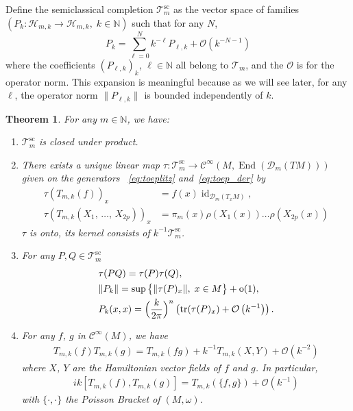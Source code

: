 \documentclass[10pt,a4paper]{article}
\newtheorem{theo}{Theorem}[section]
\theoremstyle{definition}
\numberwithin{equation}{section}
\newcommand{\N}{{\mathbb{N}}}
\newcommand{\om}{{\omega}}
\newcommand{\op}{\operatorname}
\newcommand{\Ci}{{\mathcal{C}}^{\infty}}
\newcommand{\bigo}{\mathcal{O}}
\newcommand{\D}{\mathcal{D}}
\newcommand{\Hilb}{\mathcal{H}}
\newcommand{\clT}{\mathcal{T}}
\begin{document}
 Define the semiclassical completion $\clT_m ^{\op{sc}}$ as the vector space of families $(P_k : \Hilb_{m,k} \rightarrow \Hilb_{m,k}, \; k \in
\N)$ such that for any $N$,
\[
P_k = \sum_{\ell= 0 } ^N k^{-\ell} P_{\ell,k} + \bigo \left(k ^{-N-1}\right)
\]
where the coefficients $(P_{\ell, k })_k$, $\ell \in \N$ all belong to $\clT_m$, and the $\bigo $ is for the operator norm. This expansion is meaningful because as we will see later, for any $\ell$, the operator norm $\| P_{\ell, k}\|$ is bounded independently of $k$.



\begin{theo}\label{theo:Toeplitz_Landau}
For any $m \in \N$, we have:
\begin{enumerate}
\item\label{theo1.3.1} $ \clT_m^{\op{sc}}$ is closed under product.
\item\label{theo1.3.2}  There exists a unique linear map $ \mathcal{\tau} : \clT_m^{\op{sc}} \rightarrow \Ci (M,
\op{End} (\D_m (TM))) $ given on the generators ~\eqref{eq:toeplitz} and~\eqref{eq:toep_der} by
\begin{equation}\label{eq:symbolmap}
\begin{split}
\tau (T_{m,k} (f))_x & = f(x) \op{id}_{\D_m (T_x M)}, \\ \tau \left(T_{m,k} \left(X_1,\, \ldots,\, X_{2p}\right)\right)_x & = \pi_m(x) \rho(X_1(x))
\ldots \rho (X_{2p}(x))
\end{split}
\end{equation}
$\tau$ is onto, its kernel consists of $k^{-1} \clT_{m}^{\op{sc}}$.
\item\label{theo1.3.3} For any $P,Q \in \clT_{m}^{\op{sc}}$
\begin{align}
 &\tau (PQ) = \tau (P) \tau (Q),\label{eq:prod} \\
 &\| P_k \| = \sup \big\{ \| \tau (P)_x \|, \; x \in M \big\} + \op{o} (1),  \label{eq:norm}\\ 
 &P_k(x,x) = \Bigl(\frac{k}{2\pi} \Bigr)^n \left(\op{tr} (\tau (P)_x) + \bigo \left(k^{-1}\right)\right).\label{eq:trace}
\end{align}
\item\label{theo1.3.4} For any $f$, $g$ in $\Ci (M)$, we have
\begin{gather}\label{eq:produit}
T_{m,k} (f) T_{m,k} (g) = T_{m,k} (fg) + k^{-1} T_{m,k} (X,Y) + \bigo \left(k^{-2}\right)
\end{gather}
where $X$, $Y$ are the Hamiltonian vector fields of $f$ and $g$. In particular,
\begin{gather}\label{eq:com_poisson}
ik \left[T_{m,k} (f), T_{m,k} (g)\right] = T_{m,k} (\{ f,g \}) + \bigo \left(k^{-1}\right)
\end{gather}
with $\{ \cdot, \cdot \}$ the Poisson Bracket of $(M, \om)$.
\end{enumerate}
\end{theo}
\end{document}
